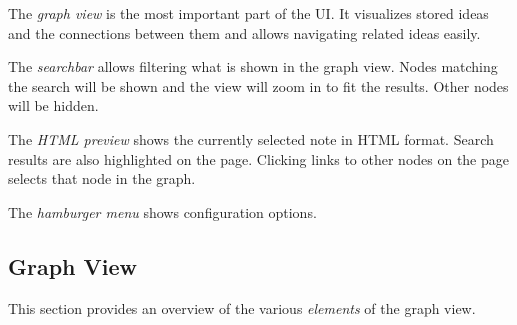 \documentclass{article}
\begin{document}
\begin{center}


\end{center}

The \emph{graph view} is the most important part of the UI. It visualizes stored ideas and the connections between them and allows navigating related ideas easily.

The \emph{searchbar} allows filtering what is shown in the graph view. Nodes matching the search will be shown and the view will zoom in to fit the results. Other nodes will be hidden.

The \emph{HTML preview} shows the currently selected note in HTML format. Search results are also highlighted on the page. Clicking links to other nodes on the page selects that node in the graph.

The \emph{hamburger menu} shows configuration options.

\newpage

\subsection{Graph View}\label{sec:graph_view}

This section provides an overview of the various \emph{elements} of the graph view. 
\end{document}
